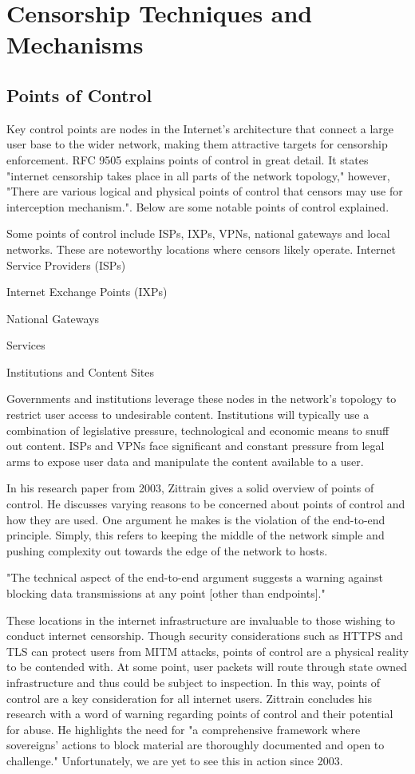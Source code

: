 \section{Censorship Techniques and Mechanisms} 

\subsection{Points of Control}
Key control points are nodes in the Internet’s architecture that connect a large user base to the wider network, making them attractive targets for censorship enforcement. RFC 9505 explains points of control in great detail. It states "internet censorship takes place in all parts of the network topology," however, "There are various logical and physical points of control that censors may use for interception mechanism."\cite{rfc9505}. Below are some notable points of control explained.

Some points of control include ISPs, IXPs, VPNs, national gateways and local networks. These are noteworthy locations where censors likely operate.
Internet Service Providers (ISPs)

Internet Exchange Points (IXPs)

National Gateways

Services

Institutions and Content Sites

Governments and institutions leverage these nodes in the network's topology to restrict user access to undesirable content.  Institutions will typically use a combination of legislative pressure, technological and economic means to snuff out content. ISPs and VPNs face significant and constant pressure from legal arms to expose user data and manipulate the content available to a user. 


In his research paper from 2003, Zittrain gives a solid overview of points of control. He discusses varying reasons to be concerned about points of control and how they are used. One argument he makes is the violation of the end-to-end principle. Simply, this refers to keeping the middle of the network simple and pushing complexity out towards the edge of the network to hosts. 

"The technical aspect of the end-to-end argument suggests a warning against blocking data transmissions at any point [other than endpoints]." \cite{Zittrain_Internet_Points_of_Control}

These locations in the internet infrastructure are invaluable to those wishing to conduct internet censorship. Though security considerations such as HTTPS and TLS can protect users from MITM attacks, points of control are a physical reality to be contended with. At some point, user packets will route through state owned infrastructure and thus could be subject to inspection. In this way, points of control are a key consideration for all internet users. Zittrain concludes his research with a word of warning regarding points of control and their potential for abuse. He highlights the need for "a comprehensive framework where sovereigns’ actions to block material are thoroughly documented and open to challenge." \cite{Zittrain_Internet_Points_of_Control} Unfortunately, we are yet to see this in action since 2003.

